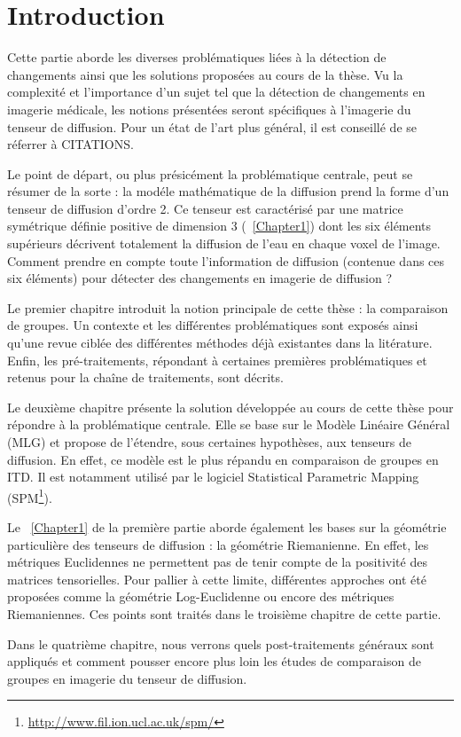 
\chapter*{Introduction}

Cette partie aborde les diverses problématiques liées à la détection de changements ainsi que les solutions proposées au cours de la thèse. 
Vu la complexité et l'importance d'un sujet tel que la détection de changements en imagerie médicale, les notions présentées seront spécifiques à l'imagerie du tenseur de diffusion. 
Pour un état de l'art plus général, il est conseillé de se réferrer à {\color{red}CITATIONS}.


Le point de départ, ou plus présicément la problématique centrale, peut se résumer de la sorte :
la modéle mathématique de la diffusion prend la forme d'un tenseur de diffusion d'ordre 2. Ce tenseur est caractérisé par une matrice symétrique définie positive de dimension 3 (\chaptername\ \ref{Chapter1}) dont les six éléments supérieurs décrivent totalement la diffusion de l'eau en chaque voxel de l'image. 
Comment prendre en compte toute l'information de diffusion (contenue dans ces six éléments) pour détecter des changements en imagerie de diffusion ?


Le premier chapitre introduit la notion principale de cette thèse : la comparaison de groupes. 
Un contexte et les différentes problématiques sont exposés ainsi qu'une revue ciblée des différentes méthodes déjà existantes dans la litérature.
Enfin, les pré-traitements, répondant à certaines premières problématiques et retenus pour la chaîne de traitements, sont décrits.


Le deuxième chapitre présente la solution développée au cours de cette thèse pour répondre à la problématique centrale. 
Elle se base sur le Modèle Linéaire Général (MLG) et propose de l'étendre, sous certaines hypothèses, aux tenseurs de diffusion.
En effet, ce modèle est le plus répandu en comparaison de groupes en ITD. 
Il est notamment utilisé par le logiciel \og Statistical Parametric Mapping \fg (SPM\footnote{\url{http://www.fil.ion.ucl.ac.uk/spm/}}).


Le \chaptername\ \ref{Chapter1} de la première partie aborde également les bases sur la géométrie particulière des tenseurs de diffusion : la géométrie Riemanienne.
En effet, les métriques Euclidennes ne permettent pas de tenir compte de la positivité des matrices tensorielles.
Pour pallier à cette limite, différentes approches ont été proposées comme la géométrie Log-Euclidenne \cite{Arsigny2006} ou encore des métriques Riemaniennes.
Ces points sont traités dans le troisième chapitre de cette partie.

Dans le quatrième chapitre, nous verrons quels post-traitements généraux sont appliqués et comment pousser encore plus loin les études de comparaison de groupes en imagerie du tenseur de diffusion.
